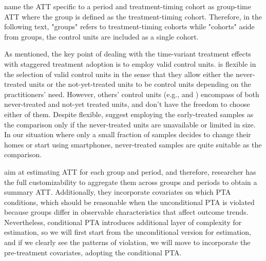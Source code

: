 

\cite{callaway2021difference} name the ATT specific to a period and treatment-timing cohort as group-time ATT where the group is defined as the treatment-timing cohort.
Therefore, in the following text, "groups" refers to treatment-timing cohorts while "cohorts" aside from groups, the control units are included as a single cohort.

As mentioned, the key point of dealing with the time-variant treatment effects with staggered treatment adoption is to employ valid control units.
\cite{callaway2021difference} is flexible in the selection of valid control units in the sense that they allow either the never-treated units or the not-yet-treated units to be control units depending on the practitioners' need. However, others' control units (e.g., \cite{sun2021estimating} and \cite{borusyak2024revisiting}) encompass of both never-treated and not-yet treated units, and don't have the freedom to choose either of them. Despite flexible, \cite{callaway2021difference} suggest employing the early-treated samples as the comparison only if the never-treated units are unavailable or limited in size. In our situation where only a small fraction of samples decides to change their homes or start using smartphones, never-treated samples are quite suitable as the comparison.

\cite{callaway2021difference} aim at estimating ATT for each group and period, and therefore, researcher has the full customizability to aggregate them across groups and periods to obtain a summary ATT.
Additionally, they incorporate covariates on which PTA conditions, which should be reasonable when the unconditional PTA is violated because groups differ in observable characteristics that affect outcome trends.
Nevertheless, conditional PTA introduces additional layer of complexity for estimation, so we will first start from the unconditional version for estimation, and if we clearly see the patterns of violation, we will move to incorporate the pre-treatment covariates, adopting the conditional PTA.

